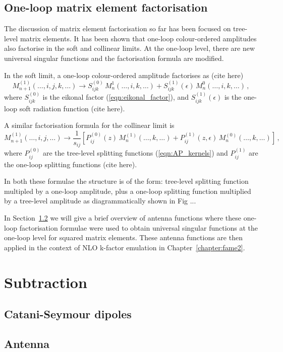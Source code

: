 \documentclass[main.tex]{subfiles}
\begin{document}
\subsection{One-loop matrix element factorisation}\label{sec:OL_factorisation}
    The discussion of matrix element factorisation so
    far has been focused on tree-level matrix elements.
    It has been shown that one-loop colour-ordered amplitudes
    also factorise in the soft and collinear limits. At the one-loop level,
    there are new universal singular functions and the
    factorisation formula are modified.

    In the soft limit, a one-loop colour-ordered amplitude
    factorises as (cite here)
    \begin{equation}\label{eqn:1L_soft_factorisation}
        M_{n+1}^{(1)}(\ldots, i, j, k, \ldots) \rightarrow S_{ijk}^{(0)} \, M_{n}^{1}(\ldots, i, k, \ldots) + S_{ijk}^{(1)}(\epsilon) \, M_{n}^{0}(\ldots, i, k, \ldots) \, ,
    \end{equation}
    where $S_{ijk}^{(0)}$ is the eikonal factor (\ref{eqn:eikonal_factor}),
    and $S_{ijk}^{(1)}(\epsilon)$ is the one-loop soft radiation function (cite here).

    A similar factorisation formula for the collinear limit is
    \begin{equation}\label{eqn:1L_collinear_factorisation}
        M_{n+1}^{(1)}(\ldots, i, j, \ldots) \rightarrow \dfrac{1}{s_{ij}} \left[ P_{ij}^{(0)}(z) \, M_{n}^{(1)}(\ldots, k, \ldots) + P_{ij}^{(1)}(z, \epsilon) \, M_{n}^{(0)}(\ldots, k, \ldots) \right] \, ,
    \end{equation}
    where $P_{ij}^{(0)}$ are the tree-level splitting functions
    (\ref{eqn:AP_kernels}) and $P_{ij}^{(1)}$
    are the one-loop splitting functions (cite here).

    In both these formulae the structure is of the form:
    tree-level splitting function multipled by a one-loop
    amplitude, plus a one-loop splitting function multiplied
    by a tree-level amplitude as diagrammatically shown
    in Fig ...

    In Section~\ref{sec:antenna_functions} we will give
    a brief overview of antenna functions where these one-loop
    factorisation formulae were used to obtain universal singular functions
    at the one-loop level for squared matrix elements. These
    antenna functions are then applied in the context of NLO
    k-factor emulation in Chapter~\ref{chapter:fame2}.

\section{Subtraction}\label{sec:subtraction}
\subsection{Catani-Seymour dipoles}\label{sec:CS_dipoles}
\subsection{Antenna}\label{sec:antenna_functions}
\end{document}
